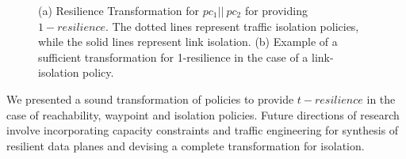 \begin{figure}
	\centering
	\caption{\label{fig:restransform}
		(a) Resilience Transformation for $pc_1 || \ pc_2$ for providing $1-resilience$. 
		The dotted lines represent traffic isolation policies, 
		while the solid lines represent link isolation. (b) Example of a sufficient transformation
		for 1-resilience in the case of a link-isolation policy.}
\end{figure}

We presented a sound transformation of policies to provide $t-resilience$ in
the case of reachability, waypoint and isolation policies. Future directions of 
research involve incorporating capacity constraints and traffic engineering
for synthesis of resilient data planes and devising a complete transformation for isolation.
